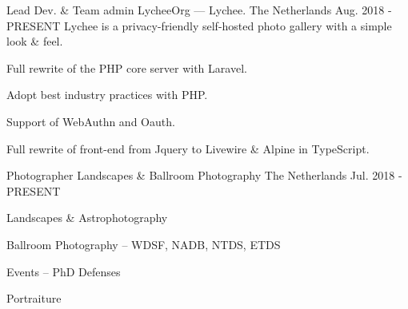 
\begin{cventries}
	\cventrysix
	{Lead Dev. \& Team admin} %
	{LycheeOrg --- Lychee.} %
	{The Netherlands} %
	{Aug. 2018 - PRESENT} %
	{Lychee is a privacy-friendly self-hosted photo gallery with a simple look \& feel.}
	{
		\begin{cvitems} %
			\item {Full rewrite of the PHP core server with Laravel.}
			\item {Adopt best industry practices with PHP.}
			\item {Support of WebAuthn and Oauth.}
			\item {Full rewrite of front-end from Jquery to Livewire \& Alpine in TypeScript.}
		\end{cvitems}
	}
	\cventry
	{Photographer} %
	{Landscapes \& Ballroom Photography} %
	{The Netherlands} %
	{Jul. 2018 - PRESENT} %
	{
		\begin{cvitems}
			\item Landscapes \& Astrophotography
			\item Ballroom Photography -- WDSF, NADB, NTDS, ETDS
			\item Events -- PhD Defenses
			\item Portraiture
		\end{cvitems}
}
\end{cventries}
